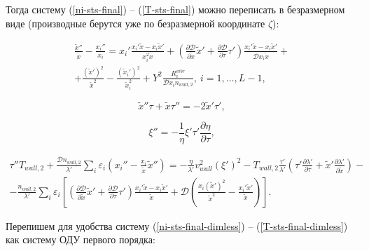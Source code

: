 \documentclass[12pt]{article}
\begin{document}
Тогда систему (\ref{ni-sts-final}) -- (\ref{T-sts-final}) можно переписать в безразмерном виде (производные берутся уже по безразмерной координате $\zeta$):

\begin{multline}
\frac{\tilde{x}''}{\tilde{x}} - \frac{x_{i}''}{x_{i}} = 
  x_{i}' \frac{x_{i}'\tilde{x} - x_{i}\tilde{x}'}{x_{i}^2 \tilde{x}} + \left(\frac{\partial \mathcal{D}}{\partial \tilde{x}}\tilde{x}' + \frac{\partial \mathcal{D}}{\partial \tau}\tau' \right) \frac{x_{i}'\tilde{x} - x_{i}\tilde{x}'}{\mathcal{D}x_{i}\tilde{x}} + \\
  + \frac{\left(\tilde{x}'\right)^2}{\tilde{x}^2} - \frac{\left(\tilde{x}_{i}'\right)^2}{\tilde{x}_{i}^2} + Y^{2}\frac{R_{i}^{vibr}}{\mathcal{D}x_{i}n_{wall,2}},\:i=1,\ldots,L-1,\label{ni-sts-final-dimless}
\end{multline}

\begin{equation}
  \tilde{x}''\tau + \tilde{x}\tau'' = -2\tilde{x}'\tau',
\end{equation}

\begin{equation}
  \xi'' = -\frac{1}{\eta} \xi' \tau' \frac{\partial \eta}{\partial \tau},
\end{equation}

\begin{multline}
  \tau''T_{wall,2} + \frac{\mathcal{D}n_{wall,2}}{\lambda'}\sum_{i}\varepsilon_{i}\left(x_{i}'' - \frac{x_{i}}{\tilde{x}}\tilde{x}'' \right) = -\frac{\eta}{\lambda'} v_{wall}^2 \left(\xi' \right)^2 - T_{wall,2}\frac{\tau'}{\lambda'} \left(\tau' \frac{\partial \lambda'}{\partial \tau} + \tilde{x}' \frac{\partial \lambda'}{\partial \tilde{x}} \right) - \\
  - \frac{n_{wall,2}}{\lambda'}\sum_{i}\varepsilon_{i} \left[\left(\frac{\partial \mathcal{D}}{\partial \tilde{x}}\tilde{x}' + \frac{\partial \mathcal{D}}{\partial \tau}\tau' \right) \frac{x_{i}'\tilde{x} - x_{i}\tilde{x}'}{\tilde{x}} + \mathcal{D}\left(\frac{x_{i}\left(\tilde{x}'\right)^2}{\tilde{x}^2} - \frac{x_{i}'\tilde{x}'}{\tilde{x}} \right)  \right].\label{T-sts-final-dimless}
\end{multline}

Перепишем для удобства систему (\ref{ni-sts-final-dimless}) -- (\ref{T-sts-final-dimless}) как систему ОДУ первого порядка:
\end{document}

